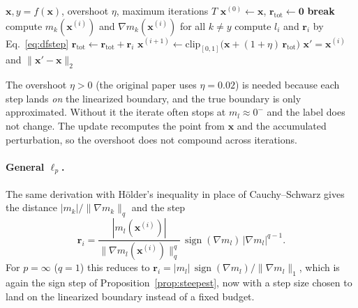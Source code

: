 \documentclass[10pt,a4paper]{extarticle}
\theoremstyle{definition}
\newcommand{\x}{\mathbf{x}}
\newcommand{\xadv}{\mathbf{x}'}
\DeclareMathOperator{\sign}{sign}
\begin{document}
\begin{algorithm}[h]
\caption{DeepFool, \(\ell_2\), untargeted}
\begin{algorithmic}[1]
\Require \(\x, y=f(\x)\), overshoot \(\eta\), maximum iterations \(T\)
\State \(\x^{(0)}\gets\x\), \(\mathbf{r}_{\mathrm{tot}}\gets\mathbf{0}\)
  \If{\(f(\x^{(i)})\neq y\)} \textbf{break} \EndIf
  \State compute \(m_k(\x^{(i)})\) and \(\nabla m_k(\x^{(i)})\) for all \(k\neq y\) 
  \State compute \(l_i\) and \(\mathbf{r}_i\) by Eq.~\eqref{eq:dfstep}
  \State \(\mathbf{r}_{\mathrm{tot}}\gets\mathbf{r}_{\mathrm{tot}}+\mathbf{r}_i\)
  \State \(\x^{(i+1)}\gets\mathrm{clip}_{[0,1]}\big(\x+(1+\eta)\,\mathbf{r}_{\mathrm{tot}}\big)\)
\EndFor
\State \Return \(\xadv=\x^{(i)}\) and \(\|\xadv-\x\|_2\)
\end{algorithmic}
\end{algorithm}

The overshoot \(\eta>0\) (the original paper uses \(\eta=0.02\)) is needed because each step lands \emph{on} the linearized boundary, and the true boundary is only approximated. Without it the iterate often stops at \(m_{l}\approx0^-\) and the label does not change. The update recomputes the point from \(\x\) and the accumulated perturbation, so the overshoot does not compound across iterations.

\paragraph{General \(\ell_p\).} The same derivation with Hölder's inequality in place of Cauchy--Schwarz gives the distance \(|m_k|/\|\nabla m_k\|_q\) and the step
\[
\mathbf{r}_i=\frac{|m_{l}(\x^{(i)})|}{\|\nabla m_{l}(\x^{(i)})\|_q^{q}}\,\sign(\nabla m_{l})\,|\nabla m_{l}|^{q-1}.
\]
For \(p=\infty\) (\(q=1\)) this reduces to \(\mathbf{r}_i=|m_l|\,\sign(\nabla m_l)/\|\nabla m_l\|_1\), which is again the sign step of Proposition~\ref{prop:steepest}, now with a step size chosen to land on the linearized boundary instead of a fixed budget.
\end{document}
